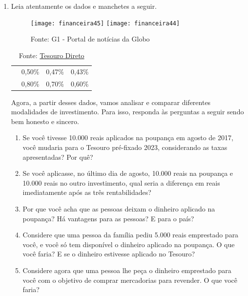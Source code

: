 \begin{enumerate}
\item Leia atentamente os dados e manchetes a seguir.

\begin{figure}[H]
\centering

\texttt{[image: financeira45]}
\texttt{[image: financeira44]}

\caption{Fonte: G1 - Portal de notícias da Globo}
\end{figure}

\begin{table}[H]
\centering
\begin{tabu} to \textwidth{|c|c|c|c|}
\hhline{~|---|}
&  &  &  \\
\hline
{} & 0,50\% & 0,47\% & 0,43\% \\
\hline
{} & 0,80\% & 0,70\% & 0,60\% \\
\hline
\end{tabu}
\caption{Fonte: \href{http://www.tesouro.fazenda.gov.br/tesouro-direto-precos-e-taxas-dos-titulos;  http://www4.bcb.gov.br/pec/poupanca/poupanca.asp}{Tesouro Direto}}
\end{table}

Agora, a partir desses dados, vamos analisar e comparar diferentes modalidades de investimento. Para isso, responda às perguntas a seguir sendo bem honesto e sincero.
  \begin{enumerate}
  \item Se você tivesse 10.000 reais aplicados na poupança em agosto de 2017, você mudaria para o Tesouro pré-fixado 2023, considerando as taxas apresentadas? Por quê?
  \item Se você aplicasse, no último dia de agosto, 10.000 reais na poupança e 10.000 reais no outro investimento, qual seria a diferença em reais imediatamente após as três rentabilidades? 
  \item Por que você acha que as pessoas deixam o dinheiro aplicado na poupança? Há vantagens para as pessoas? E para o país?
  \item Considere que uma pessoa da família pediu 5.000 reais emprestado para você, e você só tem disponível o dinheiro aplicado na poupança. O que você faria? E se o dinheiro estivesse aplicado no Tesouro? 
  \item Considere agora que uma pessoa lhe peça o dinheiro emprestado para você com o objetivo de comprar mercadorias para revender. O que você faria?
  \end{enumerate}


\end{enumerate}
